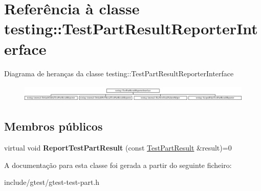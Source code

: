 \hypertarget{classtesting_1_1TestPartResultReporterInterface}{\section{Referência à classe testing\-:\-:Test\-Part\-Result\-Reporter\-Interface}
\label{classtesting_1_1TestPartResultReporterInterface}
}
Diagrama de heranças da classe testing\-:\-:Test\-Part\-Result\-Reporter\-Interface\begin{figure}[H]
\begin{center}
\leavevmode
\includegraphics[height=0.825959cm]{classtesting_1_1TestPartResultReporterInterface}
\end{center}
\end{figure}
\subsection*{Membros públicos}
\begin{DoxyCompactItemize}
\item 
\hypertarget{classtesting_1_1TestPartResultReporterInterface_aa2f920e7a5a0a6d0faf19e3727928c22}{virtual void {\bfseries Report\-Test\-Part\-Result} (const \hyperlink{classtesting_1_1TestPartResult}{Test\-Part\-Result} \&result)=0}\label{classtesting_1_1TestPartResultReporterInterface_aa2f920e7a5a0a6d0faf19e3727928c22}

\end{DoxyCompactItemize}


A documentação para esta classe foi gerada a partir do seguinte ficheiro\-:\begin{DoxyCompactItemize}
\item 
include/gtest/gtest-\/test-\/part.\-h\end{DoxyCompactItemize}
